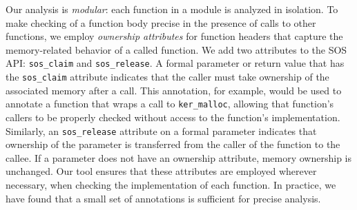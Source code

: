 Our analysis is {\em modular}:  
each function in a module is analyzed in isolation.  To make checking
of a function body precise in the presence of calls to other
functions, we employ
{\em ownership attributes} for function headers that capture the memory-related
behavior of a called function.
We add two attributes to the SOS API: {\tt sos\_claim} and {\tt sos\_release}.
A formal parameter or return value
that has the {\tt sos\_claim} attribute indicates that the
caller must take ownership of the associated memory after a call.
This annotation, for example, would be used to annotate a function that
wraps a call to {\tt ker\_malloc}, allowing that function's callers to
be properly checked without access to the function's implementation.
Similarly, an {\tt sos\_release} attribute on a formal parameter
%
indicates that ownership of the parameter is transferred from the caller of the
function to the callee.
%
If a parameter does not have an ownership attribute, memory ownership
is unchanged.
Our tool ensures that these attributes are employed wherever 
necessary, when checking the implementation of each function. 
%
In practice, we have found that a small set of annotations
is sufficient for precise analysis.

